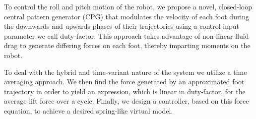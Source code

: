 To control the roll and pitch motion of the robot, we propose a novel, closed-loop central pattern generator (CPG) that modulates the velocity of each foot during the downwards and upwards phases of their trajectories using a control input parameter we call duty-factor. This approach takes advantage of non-linear fluid drag to generate differing forces on each foot, thereby imparting moments on the robot. 
	
To deal with the hybrid and time-variant nature of the system we utilize a time averaging approach. We then find the force generated by an approximated foot trajectory in order to yield an expression, which is linear in duty-factor, for the average lift force over a cycle.  Finally, we design a controller, based on this force equation, to achieve a desired spring-like virtual model.
